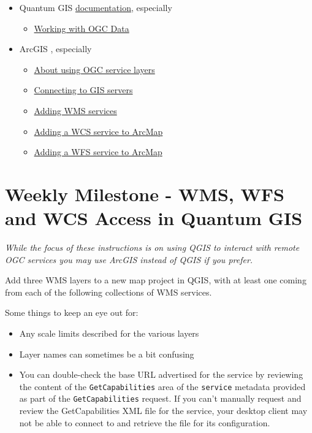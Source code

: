 \documentclass[]{book}
\providecommand{\tightlist}{%
  \setlength{\itemsep}{0pt}\setlength{\parskip}{0pt}}
\begin{document}
\begin{itemize}
\tightlist
\item
  Quantum GIS
  \href{http://docs.qgis.org/2.8/en/docs/user_manual/}{documentation},
  especially

  \begin{itemize}
  \tightlist
  \item
    \href{http://docs.qgis.org/2.8/en/docs/user_manual/working_with_ogc/index.html}{Working
    with OGC Data}
  \end{itemize}
\item
  ArcGIS \href{}{}, especially

  \begin{itemize}
  \tightlist
  \item
    \href{http://desktop.arcgis.com/en/arcmap/10.3/map/web-maps-and-services/about-using-ogc-service-layers.htm}{About
    using OGC service layers}
  \item
    \href{http://desktop.arcgis.com/en/arcmap/10.3/manage-data/using-arccatalog/connecting-to-gis-servers.htm}{Connecting
    to GIS servers}
  \item
    \href{http://desktop.arcgis.com/en/arcmap/10.3/map/web-maps-and-services/adding-wms-services.htm}{Adding
    WMS services}
  \item
    \href{http://desktop.arcgis.com/en/arcmap/10.3/map/web-maps-and-services/adding-a-wcs-service-to-arcmap.htm}{Adding
    a WCS service to ArcMap}
  \item
    \href{http://desktop.arcgis.com/en/arcmap/10.3/map/web-maps-and-services/adding-a-wfs-service-to-arcmap.htm}{Adding
    a WFS service to ArcMap}
  \end{itemize}
\end{itemize}

\section{Weekly Milestone - WMS, WFS and WCS Access in Quantum
GIS}\label{week12-milestone}

\emph{While the focus of these instructions is on using QGIS to interact
with remote OGC services you may use ArcGIS instead of QGIS if you
prefer.}

Add three WMS layers to a new map project in QGIS, with at least one
coming from each of the following collections of WMS services.

Some things to keep an eye out for:

\begin{itemize}
\tightlist
\item
  Any scale limits described for the various layers
\item
  Layer names can sometimes be a bit confusing
\item
  You can double-check the base URL advertised for the service by
  reviewing the content of the \texttt{GetCapabilities} area of the
  \texttt{service} metadata provided as part of the
  \texttt{GetCapabilities} request. If you can't manually request and
  review the GetCapabilities XML file for the service, your desktop
  client may not be able to connect to and retrieve the file for its
  configuration.
\end{itemize}
\end{document}
